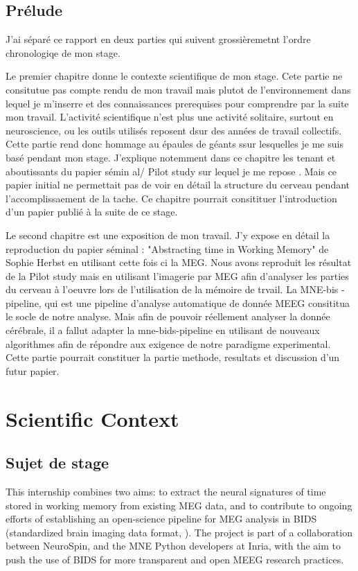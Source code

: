 \section*{Prélude}

J'ai séparé ce rapport en deux parties qui suivent grossièremetnt l'ordre chronologiqe de mon stage.

Le premier chapitre donne le contexte scientifique de mon stage. Cete partie ne consitutue pas compte rendu de mon travail mais plutot de l'environnement dans lequel je m'inserre et des connaissances prerequises pour comprendre par la suite mon travail. L'activité scientifique n'est plus une activité solitaire, surtout en neuroscience, ou les outils utilisés reposent dsur des années de travail collectifs. Cette partie rend donc hommage au épaules de géants ssur lesquelles je me suis basé pendant mon stage. J'explique notemment dans ce chapitre les tenant et aboutissants du papier sémin al/ Pilot study sur lequel je me repose \cite{herbst2021abstracting}. Mais ce papier initial ne permettait pas de voir en détail la structure du cerveau pendant l'accomplissaement de la tache. Ce chapitre pourrait consitituer l'introduction d'un papier publié à la suite de ce stage.

Le second chapitre est une exposition de mon travail. J'y expose en détail la reproduction du papier séminal : "Abstracting time in Working Memory" de Sophie Herbst en utilisant cette fois ci la MEG. Nous avons reproduit les résultat de la Pilot study mais en utilisant l'imagerie par MEG afin d'analyser les parties du cerveau à l'oeuvre lors de l'utilisation de la mémoire de trvail. La MNE-bis -pipeline, qui est une pipeline d'analyse automatique de donnée MEEG consititua le socle de notre analyse. Mais afin de pouvoir réellement analyser la donnée cérébrale, il a fallut adapter la mne-bids-pipeline en utilisant de nouveaux algorithmes afin de répondre aux exigence de notre paradigme experimental. Cette partie pourrait constituer la partie methode, resultats et discussion d'un futur papier.


\chapter{Scientific Context}

\section{Sujet de stage}
This internship combines two aims: to extract the neural signatures of time stored
in working memory from existing MEG data, and to contribute to ongoing efforts of
establishing an open-science pipeline for MEG analysis in BIDS (standardized brain imaging
data format, \cite{gorgolewski2016brain}). The project is part of a collaboration between NeuroSpin, and the MNE
Python developers at Inria, with the aim to push the use of BIDS for
more transparent and open MEEG research practices.


